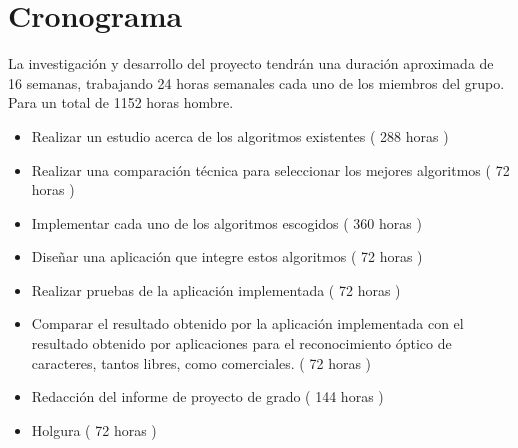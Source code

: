 \documentclass[a4paper, 11pt, oneside]{article}
\begin{document}
	\clearpage
	
	\section{Cronograma}
	La investigación y desarrollo del proyecto tendrán una duración aproximada de 16 semanas,
	trabajando 24 horas semanales cada uno de los miembros del grupo. Para un total de 1152
	horas hombre.
	\begin{itemize}
	\item Realizar un estudio acerca de los algoritmos existentes ( 288 horas )
	\item Realizar una comparación técnica para seleccionar los mejores algoritmos ( 72 horas )
	\item Implementar cada uno de los algoritmos escogidos ( 360 horas )
	\item Diseñar una aplicación que integre estos algoritmos ( 72 horas )
	\item Realizar pruebas de la aplicación implementada ( 72 horas )
	\item Comparar el resultado obtenido por la aplicación implementada con el resultado obtenido por aplicaciones para el reconocimiento óptico de caracteres, tantos libres, como comerciales. ( 72 horas )
	\item Redacción del informe de proyecto de grado ( 144 horas )
	\item Holgura ( 72 horas )
	\end{itemize}
	\clearpage
	


\nocite{*}
\end{document}
